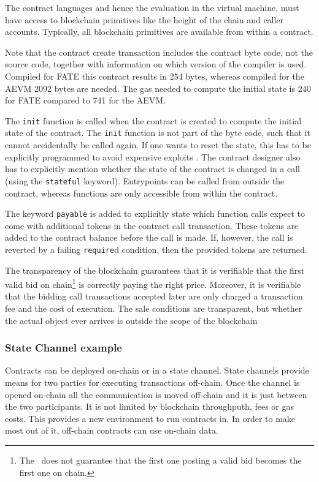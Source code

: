 The contract languages and hence the evaluation in the virtual
machine, must have access to blockchain primitives like the height of
the chain and caller accounts. Typically, all blockchain
primitives are available from within a contract.

Note that the contract create transaction includes the contract
byte code, not the source code, together with information on
which version of the compiler is used. Compiled for FATE this contract
results in 254 bytes, whereas compiled for the AEVM 2092 bytes are
needed. The gas needed to compute the initial state is 240 for FATE compared
to 741 for the AEVM.

The \texttt{init} function is called when the contract is created to
compute the initial state of the contract. The \texttt{init} function
is not part of the byte code, such that it cannot accidentally be
called again. If one wants to reset the state, this has to be
explicitly programmed to avoid expensive exploits
\cite{suiche2017280}.
The contract designer also has to explicitly mention whether the
state of the contract is changed in a call (using the
\texttt{stateful} keyword).
Entrypoints can be called from outside the contract, whereas functions
are only accessible from within the contract.

The keyword \texttt{payable} is added to explicitly state which
function calls expect to come with additional tokens in the contract
call transaction. These tokens are added to the contract balance
before the call is made. If, however, the call is reverted by a failing
\texttt{require}d condition, then the provided tokens are returned.

The transparency of the blockchain guarantees that it is verifiable
that the first valid bid on chain\footnote{The \blockchain\
  does not guarantee that the first one posting a valid bid becomes
  the first one on chain.} is correctly paying the right
price. Moreover, it is verifiable that the bidding call transactions accepted
later are
only charged a transaction fee and the cost of execution.
The sale conditions are transparent, but whether the actual object ever
arrives is outside the scope of the blockchain


\subsubsection{State Channel example}

Contracts can be deployed on-chain or in a state channel. State channels
provide means for two parties for executing transactions off-chain. Once the
channel is opened on-chain all the communication is moved off-chain and it is
just between the two participants. It is not limited by blockchain
throughputh, fees or gas costs. This provides a new environment to run
contracts in. In order to make most out of it, off-chain contracts can use
on-chain data.

